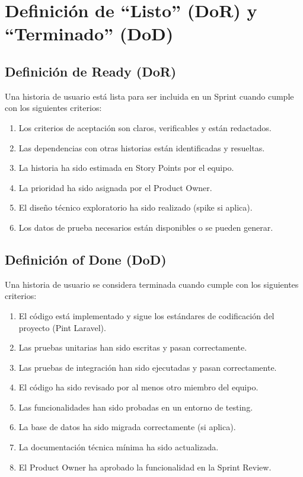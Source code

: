 \documentclass[stu]{apa7}
\begin{document}
\newpage

\section{Definición de \enquote{Listo} (DoR) y \enquote{Terminado} (DoD)}

\subsection{Definición de Ready (DoR)}

Una historia de usuario está lista para ser incluida en un Sprint cuando cumple con los siguientes criterios:

\begin{enumerate}
    \item Los criterios de aceptación son claros, verificables y están redactados.
    \item Las dependencias con otras historias están identificadas y resueltas.
    \item La historia ha sido estimada en Story Points por el equipo.
    \item La prioridad ha sido asignada por el Product Owner.
    \item El diseño técnico exploratorio ha sido realizado (spike si aplica).
    \item Los datos de prueba necesarios están disponibles o se pueden generar.
\end{enumerate}

\subsection{Definición of Done (DoD)}

Una historia de usuario se considera terminada cuando cumple con los siguientes criterios:

\begin{enumerate}
    \item El código está implementado y sigue los estándares de codificación del proyecto (Pint Laravel).
    \item Las pruebas unitarias han sido escritas y pasan correctamente.
    \item Las pruebas de integración han sido ejecutadas y pasan correctamente.
    \item El código ha sido revisado por al menos otro miembro del equipo.
    \item Las funcionalidades han sido probadas en un entorno de testing.
    \item La base de datos ha sido migrada correctamente (si aplica).
    \item La documentación técnica mínima ha sido actualizada.
    \item El Product Owner ha aprobado la funcionalidad en la Sprint Review.
\end{enumerate}
\end{document}
